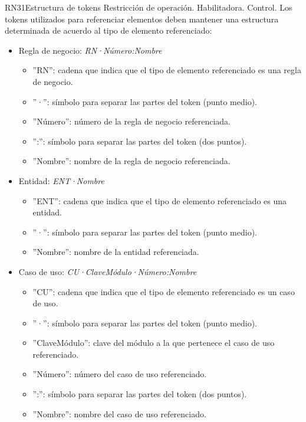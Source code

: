 \begin{BussinesRule}{RN31}{Estructura de tokens} 
	\BRitem[Tipo:] Restricción de operación. 
	\BRitem[Clase:] Habilitadora. 
	\BRitem[Nivel:] Control. %
	\BRitem[Descripción:] Los tokens utilizados para referenciar elementos deben mantener una estructura determinada de acuerdo al tipo de elemento referenciado:
	\begin{itemize}
		\item Regla de negocio: {\em RN·Número:Nombre}
		\begin{itemize}
			\item ''RN'': cadena que indica que el tipo de elemento referenciado es una regla de negocio.
			\item ''·'': símbolo para separar las partes del token (punto medio).
			\item ''Número'': número de la regla de negocio referenciada.
			\item '':'': símbolo para separar las partes del token (dos puntos).
			\item ''Nombre'': nombre de la regla de negocio referenciada.
		\end{itemize}
		\item Entidad: {\em ENT·Nombre}
		\begin{itemize}
			\item ''ENT'': cadena que indica que el tipo de elemento referenciado es una entidad.
			\item ''·'': símbolo para separar las partes del token (punto medio).
			\item ''Nombre'': nombre de la entidad referenciada.
		\end{itemize}
		\item Caso de uso: {\em CU·ClaveMódulo·Número:Nombre}
		\begin{itemize}
			\item ''CU'': cadena que indica que el tipo de elemento referenciado es un caso de uso.
			\item ''·'': símbolo para separar las partes del token (punto medio).
			\item ''ClaveMódulo'': clave del módulo a la que pertenece el caso de uso referenciado.
			\item ''Número'': número del caso de uso referenciado.
			\item '':'': símbolo para separar las partes del token (dos puntos).
			\item ''Nombre'': nombre del caso de uso referenciado.
		\end{itemize}

\end{itemize}
\end{BussinesRule}
